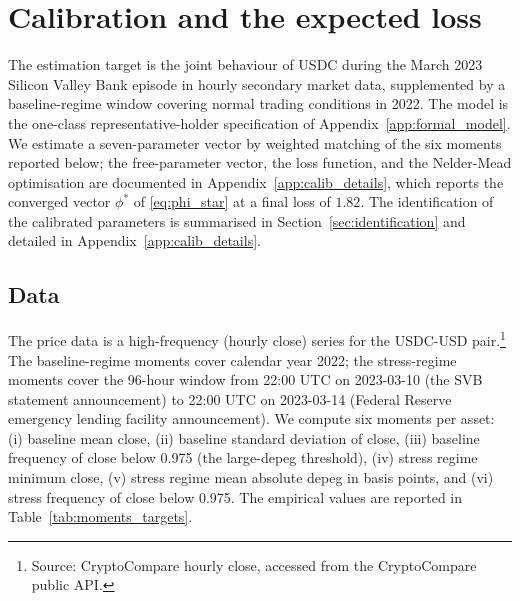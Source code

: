 \section{Calibration and the expected loss}\label{sec:calibration}

The estimation target is the joint behaviour of USDC during the March 2023 Silicon Valley Bank episode in hourly secondary market data, supplemented by a baseline-regime window covering normal trading conditions in 2022. The model is the one-class representative-holder specification of Appendix~\ref{app:formal_model}. We estimate a seven-parameter vector by weighted matching of the six moments reported below; the free-parameter vector, the loss function, and the Nelder-Mead optimisation are documented in Appendix~\ref{app:calib_details}, which reports the converged vector $\phi^*$ of \eqref{eq:phi_star} at a final loss of $1.82$. The identification of the calibrated parameters is summarised in Section~\ref{sec:identification} and detailed in Appendix~\ref{app:calib_details}.

\subsection{Data}\label{sub:calibration_data}

The price data is a high-frequency (hourly close) series for the USDC-USD pair.\footnote{Source: CryptoCompare hourly close, accessed from the CryptoCompare public API.} The baseline-regime moments cover calendar year 2022; the stress-regime moments cover the 96-hour window from 22:00 UTC on 2023-03-10 (the SVB statement announcement) to 22:00 UTC on 2023-03-14 (Federal Reserve emergency lending facility announcement). We compute six moments per asset: (i) baseline mean close, (ii) baseline standard deviation of close, (iii) baseline frequency of close below 0.975 (the large-depeg threshold), (iv) stress regime minimum close, (v) stress regime mean absolute depeg in basis points, and (vi) stress frequency of close below 0.975. The empirical values are reported in Table~\ref{tab:moments_targets}.

